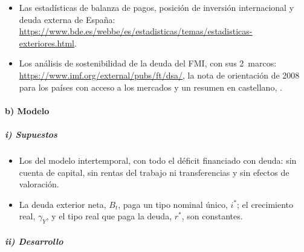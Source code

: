 \documentclass[11pt]{article}
\begin{document}
\begin{anotaciones}
\begin{itemize}
\item Las estadísticas de balanza de pagos, posición de inversión internacional y deuda externa de España: \url{https://www.bde.es/webbe/es/estadisticas/temas/estadisticas-exteriores.html}\nocite{BdE2026EstadExteriores}.
\item Los análisis de sostenibilidad de la deuda del FMI, con sus 2~marcos: \url{https://www.imf.org/external/pubs/ft/dsa/}\nocite{FMI2025DSA}, la nota de orientación de 2008 para los países con acceso a los mercados\nocite{FMI2008DSAMAC} y un resumen en castellano, \textcite{RodriguezDiez2013DSA}.
\end{itemize}
\end{anotaciones}

\paragraph{b) Modelo}

\subparagraph{i) Supuestos}

\begin{itemize}
\item Los del modelo intertemporal, con todo el déficit financiado con deuda: sin cuenta de capital, sin rentas del trabajo ni transferencias y sin efectos de valoración.
\item La deuda exterior neta, $B_t$, paga un tipo nominal único, $i^*$; el crecimiento real, $\gamma_Y$, y el tipo real que paga la deuda, $r^*$, son constantes.
\end{itemize}

\subparagraph{ii) Desarrollo}
\end{document}
